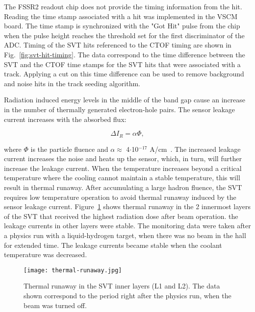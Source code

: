 The FSSR2 readout chip does not provide the timing information from the hit. Reading the time stamp associated with a hit was implemented in the VSCM board. The time stamp is synchronized with the "Got Hit" pulse from the chip when the pulse height reaches the threshold set for the first discriminator of the ADC. Timing of the SVT hits referenced to the CTOF timing are shown in Fig.~\ref{fig:svt-hit-timing}. The data correspond to the time difference between the SVT and the CTOF time stamps for the SVT hits that were associated with a track. Applying a cut on this time difference can be  used to remove background and noise hits in the track seeding algorithm.

Radiation induced energy levels in the middle of the band gap cause an increase in the number of thermally generated electron-hole pairs. The sensor leakage current increases with the absorbed flux:

\begin{equation} \Delta I_R = \alpha \Phi \label{eq:leakage-fluence},
\end{equation}

where $\Phi$ is the particle fluence and $\alpha \approx$ 4$\cdot$10$^{-17}$ A/cm~\cite{DIERLAMMTHESIS}. The increased leakage current increases the noise and heats up the sensor, which, in turn, will further increase the leakage current. When the temperature increases beyond a critical temperature where the cooling cannot maintain a stable temperature, this will result in thermal runaway. After accumulating a large hadron fluence, the SVT requires low temperature operation to avoid thermal runaway induced by the sensor leakage current. Figure~\ref{fig:thermal-runaway} shows thermal runaway in the 2 innermost layers of the SVT that received the highest radiation dose after beam operation. the leakage currents in other layers were stable. The monitoring data were taken after a physics run with a liquid-hydrogen target, when there was no beam in the hall for extended time. The leakage currents became stable when the coolant temperature was decreased.

\begin{figure}[hbt] 
\centering 
\texttt{[image: thermal-runaway.jpg]}
\caption{Thermal runaway in the SVT inner layers (L1 and L2). The data shown correspond to the period right after the physics run, when the beam was turned off.}
\label{fig:thermal-runaway}
\end{figure}

